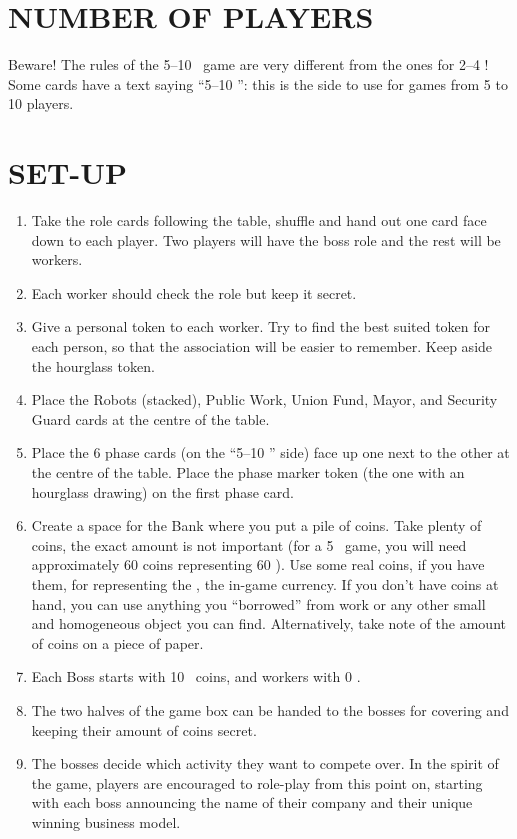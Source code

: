 \section{NUMBER OF PLAYERS}

    Beware! The rules of the 5–10 \faPeopleGroup\ game are very different from the ones for 2–4 \faPeopleGroup! Some
    cards have a text saying “5–10 \faPeopleGroup”: this is the side to use for games from 5 to 10 players.



\section{SET-UP}

    \begin{enumerate}
        \item Take the role cards following the table, shuffle and hand out one card face
        down to each player. Two players will have the boss role and the rest will
        be workers.
        \item Each worker should check the role but keep it secret.
        \item Give a personal token to each worker. Try to find the best suited token for
        each person, so that the association will be easier to remember. Keep aside
        the hourglass token.
        \item Place the Robots (stacked), Public Work, Union Fund, Mayor, and Security
        Guard cards at the centre of the table.
        \item Place the 6 phase cards (on the “5–10 \faPeopleGroup” side) face up one next to the other
        at the centre of the table. Place the phase marker token (the one with an
        hourglass drawing) on the first phase card.
        \item Create a space for the Bank where you put a pile of coins. Take plenty of
        coins, the exact amount is not important (for a 5 \faPeopleGroup\ game, you will need
        approximately 60 coins representing 60 \faRubleSign). Use some real coins, if you have
        them, for representing the \faRubleSign, the in-game currency. If you don't have coins at
        hand, you can use anything you “borrowed” from work or any other small and
        homogeneous object you can find. Alternatively, take note of the amount of
        coins on a piece of paper.
        \item Each Boss starts with 10 \faRubleSign\ coins, and workers with 0 \faRubleSign.
        \item The two halves of the game box can be handed to the bosses for covering
        and keeping their amount of coins secret.
        \item The bosses decide which activity they want to compete over. In the spirit of
        the game, players are encouraged to role-play from this point on, starting with each boss
        announcing the name of their company and their unique
        winning business model.
    \end{enumerate}

